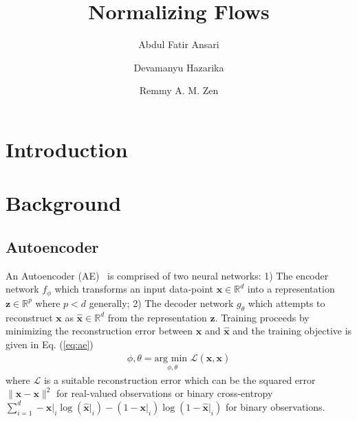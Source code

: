 \documentclass[runningheads]{llncs}
\begin{document}
%
\title{Normalizing Flows}
%
%
\author{Abdul Fatir Ansari \and
Devamanyu Hazarika\and
Remmy A. M. Zen}
%
%
%
\maketitle              %
%
\begin{abstract}


\end{abstract}
%
%
%
\section{Introduction}
\section{Background}
\subsection{Autoencoder}
An Autoencoder (AE)~\cite{hinton2006reducing} is comprised of two neural networks: 1) The encoder network $f_\phi$ which transforms an input data-point $\mathbf{x} \in \mathbb{R}^d$ into a representation $\mathbf{z} \in \mathbb{R}^p$ where $p < d$ generally; 2) The decoder network $g_\theta$ which attempts to reconstruct $\mathbf{x}$ as $\mathbf{\hat{x}} \in \mathbb{R}^d$ from the representation $\mathbf{z}$. Training proceeds by minimizing the reconstruction error between $\mathbf{x}$ and $\mathbf{\hat{x}}$ and the training objective is given in Eq. (\ref{eq:ae})
\begin{align}
\phi,\theta = \underset{{\phi,\theta}}{\text{arg min }}\mathcal{L}(\mathbf{\hat{x}}, \mathbf{x})
\label{eq:ae}
\end{align}
where $\mathcal{L}$ is a suitable reconstruction error which can be the squared error $\|\mathbf{\hat{x}} - \mathbf{x}\|^2$ for real-valued observations or binary cross-entropy $\sum_{i=1}^d- \mathbf{x}|_i\log (\mathbf{\hat{x}}|_i) - (1 - \mathbf{x}|_i)\log (1 - \mathbf{\hat{x}}|_i)$ for binary observations.
\end{document}
